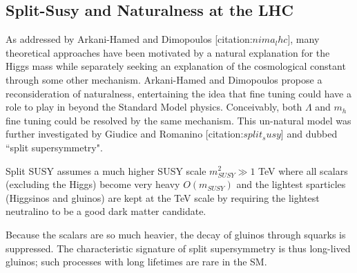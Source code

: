 \subsection{Split-Susy and Naturalness at the LHC}

As addressed by Arkani-Hamed and Dimopoulos [citation:$nima_lhc$], many theoretical approaches  have been
 motivated by a natural explanation for the Higgs mass while separately seeking an  explanation
 of the cosmological constant through some other mechanism.
Arkani-Hamed and Dimopoulos propose a reconsideration of naturalness, entertaining the idea that 
fine tuning could have a role to play in beyond the Standard Model physics.
Conceivably, both $\Lambda$ and $m_h$ fine tuning could be resolved by the same mechanism.  
This un-natural model was  further investigated by Giudice and Romanino [citation:$split_susy$]
and dubbed ``split supersymmetry". 

Split SUSY assumes a much higher SUSY scale $m_{SUSY}^2 \gg 1$ TeV where all scalars (excluding the Higgs) 
become very heavy $O(m_{SUSY})$ and the lightest sparticles (Higgsinos and gluinos) are kept at the TeV scale by requiring the lightest neutralino to be a good dark matter candidate. 

Because the scalars are so much heavier, the decay of gluinos through squarks is suppressed.
The characteristic signature of split supersymmetry is thus long-lived gluinos; such processes 
with long lifetimes are rare in the SM.
